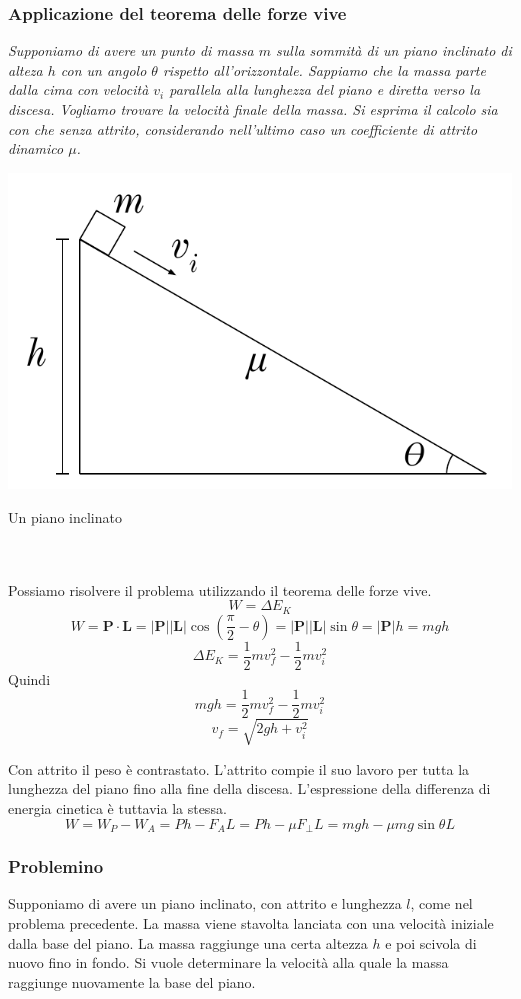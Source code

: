 \subsubsection*{Applicazione del teorema delle forze vive}
\textit{Supponiamo di avere un punto di massa $m$ sulla sommità di un piano
inclinato di alteza $h$ con un angolo $\theta$ rispetto all'orizzontale. Sappiamo
che la massa parte dalla cima con velocità $v_i$ parallela alla lunghezza del piano
e diretta verso la discesa. Vogliamo trovare la velocità finale della massa. Si
esprima il calcolo sia con che senza attrito, considerando nell'ultimo caso un
coefficiente di attrito dinamico $\mu$.}
\begin{marginfigure}
    \centering
    \includegraphics[width = \marginparwidth]{figures/pianoinclinato.pdf}
    \caption{Un piano inclinato}
\end{marginfigure}
\\\\
Possiamo risolvere il problema utilizzando il teorema delle forze vive.
\[ W = \Delta E_K \]
\[ W = \mathbf{P}\cdot\mathbf{L} = |\mathbf{P}||\mathbf{L}|\cos\left(\frac{\pi}{2} - \theta\right) = |\mathbf{P}||\mathbf{L}|\sin\theta = |\mathbf{P}|h = mgh \]
\[ \Delta E_K = \frac12mv_f^2 - \frac12mv_i^2 \]
Quindi
\[ mgh = \frac12mv_f^2 - \frac12mv_i^2 \]
\[ v_f = \sqrt{2gh + v_i^2} \]

Con attrito il peso è contrastato. L'attrito compie il suo lavoro per tutta la
lunghezza del piano fino alla fine della discesa. L'espressione della differenza
di energia cinetica è tuttavia la stessa.
\[ W = W_P - W_A = Ph - F_AL = Ph - \mu F_\perp L = mgh - \mu mg\sin\theta L \]


\subsubsection*{Problemino}
Supponiamo di avere un piano inclinato, con attrito e lunghezza $l$, come nel problema precedente.
La massa viene stavolta lanciata con una velocità iniziale dalla base del piano.
La massa raggiunge una certa altezza $h$ e poi scivola di nuovo fino in fondo. Si
vuole determinare la velocità alla quale la massa raggiunge nuovamente la base del
piano.

